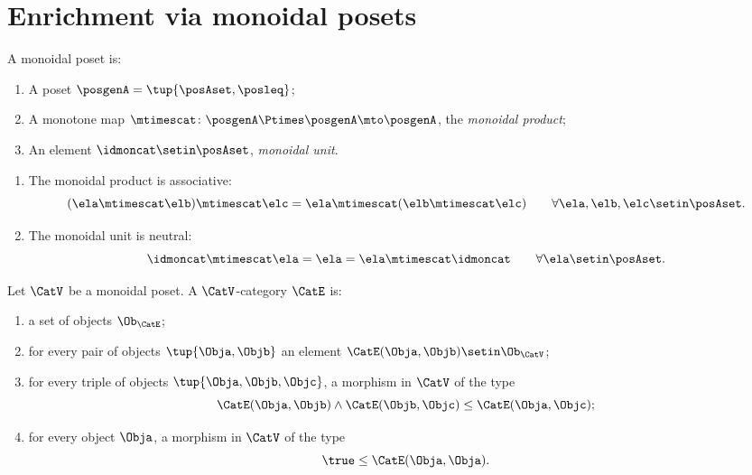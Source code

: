 
\section{Enrichment via monoidal posets}
\label{sec:quantale-enrichment}

\begin{ctdefinition}
A monoidal poset is: 

\constit
\begin{enumerate}
\item A poset $\posgenA = \tup{\posAset, \posleq}$;
\item A monotone map $\mtimescat \colon \posgenA \Ptimes \posgenA \mto \posgenA$, the \emph{monoidal product}; 
\item An element $\idmoncat \setin \posAset$, \emph{monoidal unit}. 
\end{enumerate}

\condit
\begin{enumerate}
\item The monoidal product is associative: 
\begin{equation}
(\ela \mtimescat \elb) \mtimescat \elc = \ela \mtimescat (\elb \mtimescat \elc) \qquad \forall \ela, \elb, \elc \setin \posAset.
\end{equation}
\item The monoidal unit is neutral:
\begin{equation}
\idmoncat \mtimescat \ela = \ela = \ela \mtimescat \idmoncat \qquad \forall \ela \setin \posAset.
\end{equation}
 
\end{enumerate}


\end{ctdefinition}


\begin{ctdefinition}
Let $\CatV$ be a monoidal poset. A $\CatV$-category $\CatE$ is:

\constit
\begin{enumerate}
\item a set of objects $\Ob_\CatE$; 
\item for every pair of objects $\tup{\Obja, \Objb}$ an element $\CatE(\Obja, \Objb) \setin \Ob_\CatV$; 
\item for every triple of objects $\tup{\Obja, \Objb, \Objc}$, a morphism in $\CatV$ of the type
\begin{equation}
\CatE(\Obja, \Objb) \wedge \CatE(\Objb, \Objc) \leq \CatE(\Obja, \Objc);
\end{equation}
\item for every object $\Obja$, a morphism in $\CatV$ of the type
\begin{equation}
\true \leq \CatE(\Obja, \Obja).
\end{equation}
\end{enumerate}
\end{ctdefinition}

